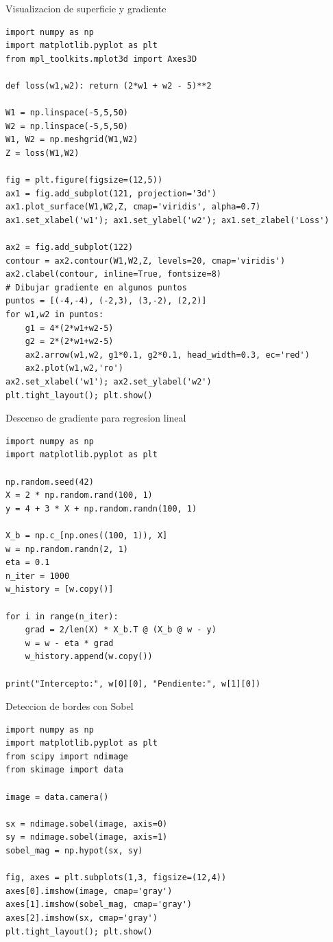 \documentclass[aspectratio=169, 10pt, xcolor=table]{beamer}
\begin{document}
\begin{frame}[fragile]{Visualizacion de superficie y gradiente}
    \begin{lstlisting}
import numpy as np
import matplotlib.pyplot as plt
from mpl_toolkits.mplot3d import Axes3D

def loss(w1,w2): return (2*w1 + w2 - 5)**2

W1 = np.linspace(-5,5,50)
W2 = np.linspace(-5,5,50)
W1, W2 = np.meshgrid(W1,W2)
Z = loss(W1,W2)

fig = plt.figure(figsize=(12,5))
ax1 = fig.add_subplot(121, projection='3d')
ax1.plot_surface(W1,W2,Z, cmap='viridis', alpha=0.7)
ax1.set_xlabel('w1'); ax1.set_ylabel('w2'); ax1.set_zlabel('Loss')

ax2 = fig.add_subplot(122)
contour = ax2.contour(W1,W2,Z, levels=20, cmap='viridis')
ax2.clabel(contour, inline=True, fontsize=8)
# Dibujar gradiente en algunos puntos
puntos = [(-4,-4), (-2,3), (3,-2), (2,2)]
for w1,w2 in puntos:
    g1 = 4*(2*w1+w2-5)
    g2 = 2*(2*w1+w2-5)
    ax2.arrow(w1,w2, g1*0.1, g2*0.1, head_width=0.3, ec='red')
    ax2.plot(w1,w2,'ro')
ax2.set_xlabel('w1'); ax2.set_ylabel('w2')
plt.tight_layout(); plt.show()
    \end{lstlisting}
\end{frame}

\begin{frame}[fragile]{Descenso de gradiente para regresion lineal}
    \begin{lstlisting}
import numpy as np
import matplotlib.pyplot as plt

np.random.seed(42)
X = 2 * np.random.rand(100, 1)
y = 4 + 3 * X + np.random.randn(100, 1)

X_b = np.c_[np.ones((100, 1)), X]
w = np.random.randn(2, 1)
eta = 0.1
n_iter = 1000
w_history = [w.copy()]

for i in range(n_iter):
    grad = 2/len(X) * X_b.T @ (X_b @ w - y)
    w = w - eta * grad
    w_history.append(w.copy())

print("Intercepto:", w[0][0], "Pendiente:", w[1][0])
    \end{lstlisting}
\end{frame}

\begin{frame}[fragile]{Deteccion de bordes con Sobel}
    \begin{lstlisting}
import numpy as np
import matplotlib.pyplot as plt
from scipy import ndimage
from skimage import data

image = data.camera()

sx = ndimage.sobel(image, axis=0)
sy = ndimage.sobel(image, axis=1)
sobel_mag = np.hypot(sx, sy)

fig, axes = plt.subplots(1,3, figsize=(12,4))
axes[0].imshow(image, cmap='gray')
axes[1].imshow(sobel_mag, cmap='gray')
axes[2].imshow(sx, cmap='gray')
plt.tight_layout(); plt.show()
    \end{lstlisting}
\end{frame}
\end{document}
